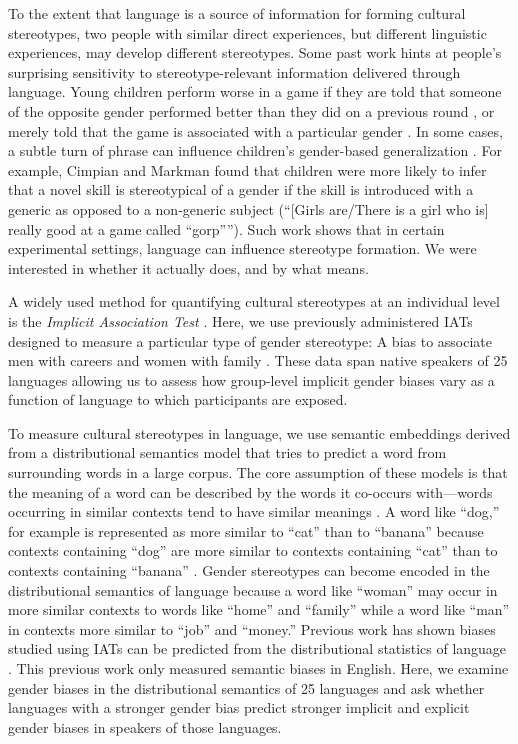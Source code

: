 \documentclass[9pt,twocolumn,twoside,lineno]{pnas-new}
\begin{document}
To the extent that language is a source of information for forming
cultural stereotypes, two people with similar direct experiences, but
different linguistic experiences, may develop different stereotypes.
Some past work hints at people's surprising sensitivity to
stereotype-relevant information delivered through language. Young
children perform worse in a game if they are told that someone of the
opposite gender performed better than they did on a previous round
\cite{rhodes2008preschoolers}, or merely told that the game is associated
with a particular gender \cite{cimpian2012good}. In some
cases, a subtle turn of phrase can influence children's gender-based
generalization \cite{cimpian2011generic,rhodes2018subtle}. For example, Cimpian and Markman found that children were more likely to infer that a novel skill is stereotypical of a
gender if the skill is introduced with a generic as opposed to a
non-generic subject (``{[}Girls are/There is a girl who is{]} really
good at a game called ``gorp''''). Such work shows that in certain
experimental settings, language can influence stereotype formation. We
were interested in whether it actually does, and by what means.

A widely used method for quantifying cultural stereotypes at an
individual level is the \emph{Implicit Association Test} \citep[IAT,][]{greenwald1998measuring}. Here, we use previously administered IATs designed to measure a particular type of gender
stereotype: A bias to associate men with careers and women with family
\cite[\emph{N} = 657,335]{nosek2002harvesting}. These data span native
speakers of 25 languages allowing us to assess how group-level implicit gender biases \cite{payne2019historical,hehman2019} vary as a function of language to which participants are exposed. 

To measure cultural stereotypes in language, we use semantic embeddings derived from a distributional semantics model that tries to predict a word from surrounding words in a large corpus. The core assumption of these models is that the meaning of a word can be described by the words it co-occurs with---words occurring in similar contexts tend to have similar meanings \cite{firth1957synopsis}. A word like \enquote{dog,} for example is represented as more similar to \enquote{cat} than to \enquote{banana} because contexts containing \enquote{dog} are more similar to contexts containing \enquote{cat} than to contexts containing \enquote{banana} \cite{landauer1997solution,lund1996producing,lenci2008distributional}. Gender stereotypes can become encoded in the distributional semantics of language because a word like \enquote{woman} may occur in more similar contexts to words like \enquote{home} and \enquote{family} while a word like \enquote{man} in contexts more similar to \enquote{job} and \enquote{money.} Previous work has shown biases studied using IATs can be predicted from the distributional statistics of language \citep[word co-occurrences,][]{caliskan2017semantics}. This previous work only measured semantic biases in English. Here, we examine gender biases in the distributional semantics of 25 languages and ask whether languages with a stronger gender bias predict stronger implicit and explicit gender biases in speakers of those languages.
\end{document}
